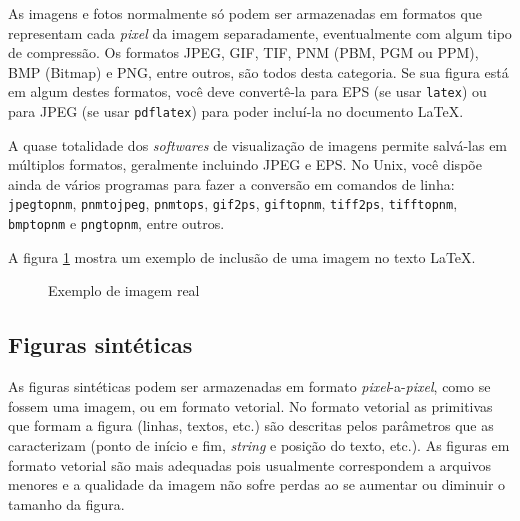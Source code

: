 As imagens e fotos normalmente só podem ser armazenadas em formatos
que representam cada \emph{pixel} da imagem separadamente,
eventualmente com algum tipo de compressão. Os formatos JPEG, GIF,
TIF, PNM (PBM, PGM ou PPM), BMP (Bitmap) e PNG, entre outros, são
todos desta categoria.  Se sua figura está em algum destes formatos,
você deve convertê-la para EPS (se usar \texttt{latex}) ou para JPEG
(se usar \texttt{pdflatex}) para poder incluí-la no documento \LaTeX.

A quase totalidade dos \emph{softwares} de visualização de imagens
permite salvá-las em múltiplos formatos, geralmente incluindo JPEG e
EPS. No Unix, você dispõe ainda de vários programas para fazer a
conversão em comandos de linha: \texttt{jpegtopnm},
\texttt{pnmtojpeg}, \texttt{pnmtops}, \texttt{gif2ps},
\texttt{giftopnm}, \texttt{tiff2ps}, \texttt{tifftopnm},
\texttt{bmptopnm} e \texttt{pngtopnm}, entre outros.

A figura \ref{Fig:belmonte} mostra um exemplo de inclusão de uma
imagem no texto \LaTeX.

\begin{figure}[htbp!] \begin{center}
\caption{Exemplo de imagem real}
\label{Fig:belmonte}
\end{center} \end{figure}

\subsection{Figuras sintéticas}
\label{Sec:figsinteticas}

As figuras sintéticas podem ser armazenadas em formato
\emph{pixel}-a-\emph{pixel}, como se fossem uma imagem, ou em
formato vetorial. No formato vetorial as primitivas que formam a
figura (linhas, textos, etc.) são descritas pelos parâmetros que as
caracterizam (ponto de início e fim, \emph{string} e posição do texto,
etc.). As figuras em formato vetorial são mais adequadas pois
usualmente correspondem a arquivos menores e a qualidade da imagem
não sofre perdas ao se aumentar ou diminuir o tamanho da figura.

